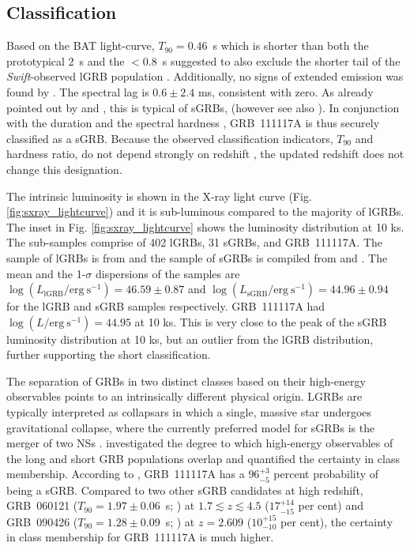 \documentclass{aa}    %
\begin{document}
\subsection{Classification} \label{classification}

Based on the BAT light-curve, $T_{90}=0.46$~s which is shorter than both the
prototypical 2~s \citep{Kouveliotou1993} and the $<0.8$~s suggested to also
exclude the shorter tail of the \textit{Swift}-observed lGRB population
\citep{Bromberg2012a}. Additionally, no signs of extended emission was found by
\citet{Sakamoto2013}. The spectral lag is $0.6 \pm2.4$ ms, consistent with zero.
As already pointed out by \citet{Margutti2012} and \citet{Sakamoto2013}, this is
typical of sGRBs, (however see also \citealt{Bernardini2015}). In conjunction
with the duration and the spectral hardness \citep{Sakamoto2011}, GRB~111117A is
thus securely classified as a sGRB. Because the observed classification
indicators, $T_{90}$ and hardness ratio, do not depend strongly on redshift
\citep{Littlejohns2013a}, the updated redshift does not change this designation.

The intrinsic luminosity is shown in the X-ray light curve (Fig.
\ref{fig:sxray_lightcurve}) and it is sub-luminous compared to the majority of
lGRBs. The inset in Fig. \ref{fig:sxray_lightcurve} shows the luminosity
distribution at 10 ks. The sub-samples comprise of 402 lGRBs, 31 sGRBs, and
GRB~111117A. The sample of lGRBs is from \citet{Evans2007, Evans2009} and the
sample of sGRBs is compiled from \citet{Kann2011, Berger2014} and
\citet{DAvanzo2014a}. The mean and the 1-$\sigma$ dispersions of the samples are
$\log(L_{\mathrm{lGRB}} / \mathrm{erg~s}^{-1}) = 46.59 \pm 0.87$ and
$\log(L_{\mathrm{sGRB}} / \mathrm{erg~s}^{-1})  = 44.96 \pm 0.94$ for the lGRB
and sGRB samples respectively. GRB~111117A had $\log(L / \mathrm{erg~s}^{-1}) =
44.95$ at 10 ks. This is very close to the peak of the sGRB luminosity
distribution at 10 ks, but an outlier from the lGRB distribution, further
supporting the short classification.

The separation of GRBs in two distinct classes based on their high-energy
observables points to an intrinsically different physical origin. LGRBs are
typically interpreted as collapsars \citep{MacFadyen1999} in which a single, massive
star undergoes gravitational collapse, where the currently preferred model for
sGRBs is the merger of two NSs \citep{Eichler1989, Nakar2007}.
\citet{Bromberg2013} investigated the degree to which high-energy observables of
the long and short GRB populations overlap and quantified the certainty in class
membership. According to \citet{Bromberg2013}, GRB~111117A has a $96_{-5}^{+3}$
percent probability of being a sGRB. Compared to two other sGRB candidates
at high redshift, GRB~060121 ($T_{90}=1.97 \pm 0.06$~s;
\citealt{DeUgartePostigo2006, Levan2006}) at $1.7 \lesssim z \lesssim 4.5$
($17_{-15}^{+14}$ per cent) and GRB~090426 ($T_{90}=1.28 \pm 0.09$~s;
\citealt{Antonelli2009, Levesque2010, Thone2011}) at $z = 2.609$ ($10_{-10}^{+15}$
per cent), the certainty in class membership for GRB~111117A is much higher.
\end{document}
